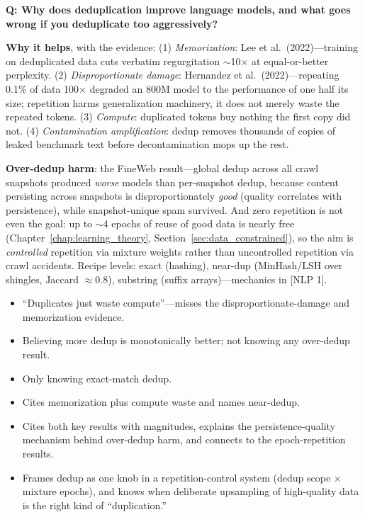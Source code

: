 \begin{interviewq}
\textbf{Q: Why does deduplication improve language models, and what goes wrong if you deduplicate too aggressively?}

 \quad {} \quad \badgefreq{\freqmed}

\stronganswer
\textbf{Why it helps}, with the evidence: (1) \textit{Memorization}: Lee et al.\ (2022)---training on deduplicated data cuts verbatim regurgitation $\sim$10$\times$ at equal-or-better perplexity. (2) \textit{Disproportionate damage}: Hernandez et al.\ (2022)---repeating 0.1\% of data 100$\times$ degraded an 800M model to the performance of one half its size; repetition harms generalization machinery, it does not merely waste the repeated tokens. (3) \textit{Compute}: duplicated tokens buy nothing the first copy did not. (4) \textit{Contamination amplification}: dedup removes thousands of copies of leaked benchmark text before decontamination mops up the rest.

\textbf{Over-dedup harm}: the FineWeb result---global dedup across all crawl snapshots produced \textit{worse} models than per-snapshot dedup, because content persisting across snapshots is disproportionately \textit{good} (quality correlates with persistence), while snapshot-unique spam survived. And zero repetition is not even the goal: up to $\sim$4 epochs of reuse of good data is nearly free (Chapter~\ref{chap:learning_theory}, Section~\ref{sec:data_constrained}), so the aim is \textit{controlled} repetition via mixture weights rather than uncontrolled repetition via crawl accidents. Recipe levels: exact (hashing), near-dup (MinHash/LSH over shingles, Jaccard $\approx 0.8$), substring (suffix arrays)---mechanics in [NLP 1].

\redflags
\begin{itemize}
    \item ``Duplicates just waste compute''---misses the disproportionate-damage and memorization evidence.
    \item Believing more dedup is monotonically better; not knowing any over-dedup result.
    \item Only knowing exact-match dedup.
\end{itemize}


\goodgreat
\begin{itemize}
    \item {} Cites memorization plus compute waste and names near-dedup.
    \item {} Cites both key results with magnitudes, explains the persistence-quality mechanism behind over-dedup harm, and connects to the epoch-repetition results.
    \item {} Frames dedup as one knob in a repetition-control system (dedup scope $\times$ mixture epochs), and knows when deliberate upsampling of high-quality data is the right kind of ``duplication.''
\end{itemize}


\end{interviewq}
